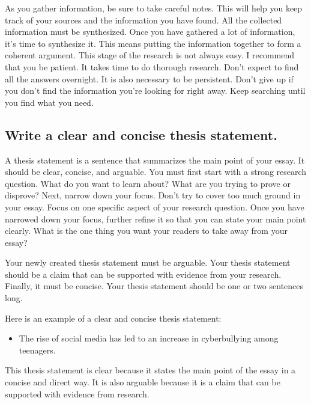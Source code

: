 \documentclass[
  b5paper]{book}
\providecommand{\tightlist}{%
  \setlength{\itemsep}{0pt}\setlength{\parskip}{0pt}}
\begin{document}
As you gather information, be sure to take careful notes. This will help you keep track of your sources and the information you have found. All the collected information must be synthesized. Once you have gathered a lot of information, it's time to synthesize it. This means putting the information together to form a coherent argument. This stage of the research is not always easy. I recommend that you be patient. It takes time to do thorough research. Don't expect to find all the answers overnight. It is also necessary to be persistent. Don't give up if you don't find the information you're looking for right away. Keep searching until you find what you need.

\hypertarget{write-a-clear-and-concise-thesis-statement.}{%
\subsection*{Write a clear and concise thesis statement.}\label{write-a-clear-and-concise-thesis-statement.}}

A thesis statement is a sentence that summarizes the main point of your essay. It should be clear, concise, and arguable. You must first start with a strong research question. What do you want to learn about? What are you trying to prove or disprove? Next, narrow down your focus. Don't try to cover too much ground in your essay. Focus on one specific aspect of your research question. Once you have narrowed down your focus, further refine it so that you can state your main point clearly. What is the one thing you want your readers to take away from your essay?

Your newly created thesis statement must be arguable. Your thesis statement should be a claim that can be supported with evidence from your research. Finally, it must be concise. Your thesis statement should be one or two sentences long.

Here is an example of a clear and concise thesis statement:

\begin{itemize}
\tightlist
\item
  The rise of social media has led to an increase in cyberbullying among teenagers.
\end{itemize}

This thesis statement is clear because it states the main point of the essay in a concise and direct way. It is also arguable because it is a claim that can be supported with evidence from research.
\end{document}
